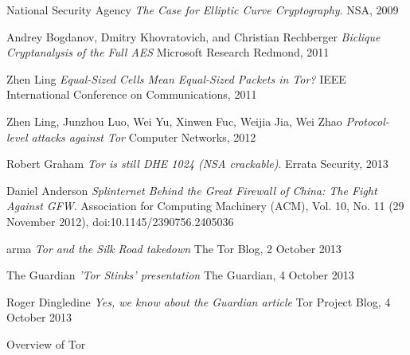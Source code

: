 \documentclass[journal]{IEEEtran}
\begin{document}
\begin{thebibliography}{9}
  National Security Agency
  \emph{The Case for Elliptic Curve Cryptography}.
  NSA, 2009

  Andrey Bogdanov, Dmitry Khovratovich, and Christian Rechberger
  \emph{Biclique Cryptanalysis of the Full AES}
  Microsoft Research Redmond, 2011

  Zhen Ling
  \emph{Equal-Sized Cells Mean Equal-Sized Packets in Tor?}
  IEEE International Conference on Communications, 2011

  Zhen Ling, Junzhou Luo, Wei Yu, Xinwen Fuc, Weijia Jia, Wei Zhao
  \emph{Protocol-level attacks against Tor}
  Computer Networks, 2012

  Robert Graham
  \emph{Tor is still DHE 1024 (NSA crackable)}.
  Errata Security, 2013

  Daniel Anderson
  \emph{Splinternet Behind the Great Firewall of China: The Fight Against GFW}.
  Association for Computing Machinery (ACM), Vol. 10, No. 11 (29 November 2012), doi:10.1145/2390756.2405036

  arma
  \emph{Tor and the Silk Road takedown}
  The Tor Blog, 2 October 2013

  The Guardian
  \emph{'Tor Stinks' presentation}
  The Guardian, 4 October 2013

  Roger Dingledine
  \emph{Yes, we know about the Guardian article}
  Tor Project Blog, 4 October 2013

  Overview of Tor

\end{thebibliography}
\end{document}
